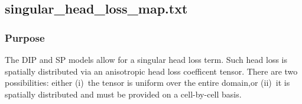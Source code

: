 \subsection{singular\_head\_loss\_map.txt}
\subsubsection{Purpose}
The DIP and SP models allow for a singular head loss term. Such head loss is spatially distributed via an anisotropic head loss coefficent tensor. There are two  possibilities: either (i)~the tensor is uniform over the entire domain,or (ii)~it is spatially distributed and must be provided on a cell-by-cell basis.
%
